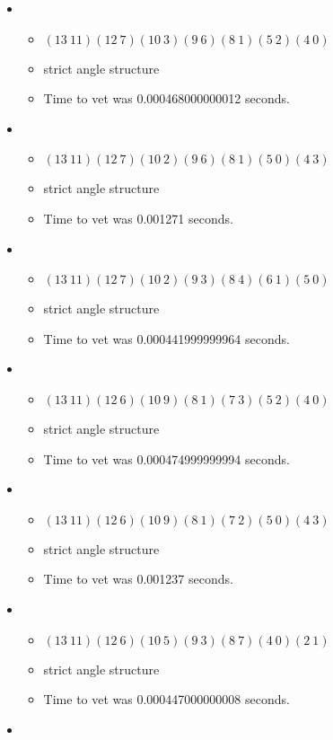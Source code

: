 \documentclass{article}
\begin{document}
\begin{itemize}
\item \begin{itemize}
      \item $(13\ 11)(12\ 7)(10\ 3)(9\ 6)(8\ 1)(5\ 2)(4\ 0)$
      \item strict angle structure
      \item Time to vet was 0.000468000000012 seconds.
\end{itemize}
\item \begin{itemize}
      \item $(13\ 11)(12\ 7)(10\ 2)(9\ 6)(8\ 1)(5\ 0)(4\ 3)$
      \item strict angle structure
      \item Time to vet was 0.001271 seconds.
\end{itemize}
\item \begin{itemize}
      \item $(13\ 11)(12\ 7)(10\ 2)(9\ 3)(8\ 4)(6\ 1)(5\ 0)$
      \item strict angle structure
      \item Time to vet was 0.000441999999964 seconds.
\end{itemize}
\item \begin{itemize}
      \item $(13\ 11)(12\ 6)(10\ 9)(8\ 1)(7\ 3)(5\ 2)(4\ 0)$
      \item strict angle structure
      \item Time to vet was 0.000474999999994 seconds.
\end{itemize}
\item \begin{itemize}
      \item $(13\ 11)(12\ 6)(10\ 9)(8\ 1)(7\ 2)(5\ 0)(4\ 3)$
      \item strict angle structure
      \item Time to vet was 0.001237 seconds.
\end{itemize}
\item \begin{itemize}
      \item $(13\ 11)(12\ 6)(10\ 5)(9\ 3)(8\ 7)(4\ 0)(2\ 1)$
      \item strict angle structure
      \item Time to vet was 0.000447000000008 seconds.
\end{itemize}
\item \begin{itemize}

\end{itemize}
\end{itemize}
\end{document}
